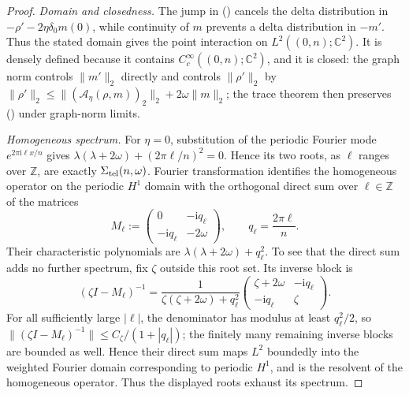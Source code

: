 \documentclass[twoside,10pt]{article}
\numberwithin{equation}{section}
\theoremstyle{slbody}
\theoremstyle{definition}
\theoremstyle{remark}
\renewcommand{\eqref}[1]{%
  \textup{{\normalfont(\oldstylenums{\ref{#1}}}\normalfont)}}
\begin{document}
\begin{proof}
\emph{Domain and closedness.}
The jump in \eqref{eq:telegraph-jump-domain} cancels the delta
distribution in $-\rho'-2\eta\delta_0m(0)$, while continuity of $m$
prevents a delta distribution in $-m'$.  Thus the stated domain gives
the point interaction on $L^2((0,n);\mathbb C^2)$.  It is densely
defined because it contains $C_c^\infty((0,n);\mathbb C^2)$, and it is
closed:
the graph norm controls $\|m'\|_2$ directly and controls
$\|\rho'\|_2$ by
$\|\rho'\|_2\le\|(\mathcal A_\eta(\rho,m))_2\|_2+
2\omega\|m\|_2$; the trace theorem then preserves
\eqref{eq:telegraph-jump-domain} under graph-norm limits.

\smallskip
\noindent\emph{Homogeneous spectrum.}
For $\eta=0$, substitution of the periodic Fourier mode
$e^{2\pi\mathrm i\ell x/n}$ gives
$\lambda(\lambda+2\omega)+(2\pi\ell/n)^2=0$.  Hence its two roots,
as $\ell$ ranges over $\mathbb Z$, are exactly
$\Sigma_{\rm tel}(n,\omega)$.
Fourier transformation identifies the homogeneous operator on the periodic
$H^1$ domain with the orthogonal direct sum over $\ell\in\mathbb Z$ of the
matrices
\[
 M_\ell:=\begin{pmatrix}
  0&-\mathrm i q_\ell\\
  -\mathrm i q_\ell&-2\omega
 \end{pmatrix},
 \qquad q_\ell=\frac{2\pi\ell}{n}.
\]
Their characteristic polynomials are
$\lambda(\lambda+2\omega)+q_\ell^2$.  To see that the direct sum adds
no further spectrum, fix $\zeta$ outside this root set.  Its inverse
block is
\[
 (\zeta I-M_\ell)^{-1}
 =\frac{1}{\zeta(\zeta+2\omega)+q_\ell^2}
  \begin{pmatrix}
   \zeta+2\omega&-\mathrm i q_\ell\\
   -\mathrm i q_\ell&\zeta
  \end{pmatrix}.
\]
For all sufficiently large $|\ell|$, the denominator has modulus at
least $q_\ell^2/2$, so
$\|(\zeta I-M_\ell)^{-1}\|\le C_\zeta/(1+|q_\ell|)$; the finitely many
remaining inverse blocks are bounded as well.  Hence their direct sum
maps $L^2$ boundedly into the weighted Fourier domain corresponding to
periodic $H^1$, and is the resolvent of the homogeneous operator.
Thus the displayed roots exhaust its spectrum.


\end{proof}
\end{document}
